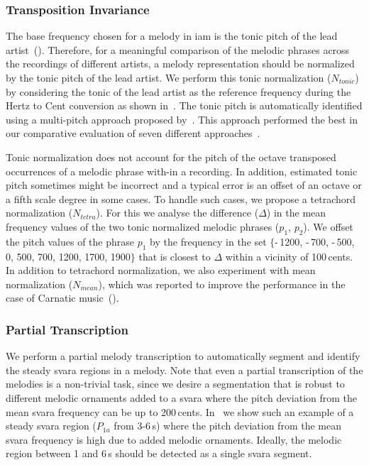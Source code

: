 \subsubsection{Transposition Invariance}
\label{sec:patterns_improving_similarity_transposition_invariance}

The base frequency chosen for a melody in \gls{iam} is the tonic pitch of the lead artist~(). Therefore, for a meaningful comparison of the melodic phrases across the recordings of different artists, a melody representation should be normalized by the tonic pitch of the lead artist. We perform this tonic normalization ($N_{tonic}$) by considering the tonic of the lead artist as the reference frequency during the Hertz to Cent conversion as shown in~. The tonic pitch is automatically identified using a multi-pitch approach proposed by~\cite{salamon2012multipitch}. This approach performed the best in our comparative evaluation of seven different approaches~.

Tonic normalization does not account for the pitch of the octave transposed occurrences of a melodic phrase with-in a recording. In addition, estimated tonic pitch sometimes might be incorrect and a typical error is an offset of an octave or a fifth scale degree in some cases. To handle such cases, we propose a tetrachord normalization ($N_{tetra}$). For this we analyse the difference ($\Delta$) in the mean frequency values of the two tonic normalized melodic phrases ($p_1$, $p_2$). We offset the pitch values of the phrase $p_1$ by the frequency in the set $\lbrace$-\,1200, -\,700, -\,500, 0, 500, 700, 1200, 1700, 1900$\rbrace$ that is closest to $\Delta$ within a vicinity of 100\,cents. In addition to tetrachord normalization, we also experiment with mean normalization ($N_{mean}$), which was reported to improve the performance in the case of Carnatic music~(). 


\subsubsection{Partial Transcription}
\label{sec:patterns_improving_similarity_partial_transcription}

We perform a partial melody transcription to automatically segment and identify the steady \gls{svara} regions in a melody. Note that even a partial transcription of the melodies is a non-trivial task, since we desire a segmentation that is robust to different melodic ornaments added to a \gls{svara} where the pitch deviation from the mean \gls{svara} frequency can be up to 200\,cents. In~ we show such an example of a steady \gls{svara} region ($P_{1a}$ from 3-6\,s) where the pitch deviation from the mean \gls{svara} frequency is high due to added melodic ornaments. Ideally, the melodic region between 1 and 6\,s should be detected as a single \gls{svara} segment.

